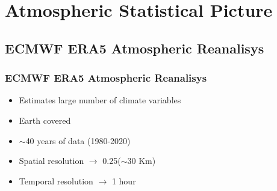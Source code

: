 \documentclass[10pt,aspectratio=169]{beamer}
\begin{document}
\section{Atmospheric Statistical Picture}

\subsection{ECMWF ERA5 Atmospheric Reanalisys}

\begin{frame}
\frametitle{ECMWF ERA5 Atmospheric Reanalisys}

\begin{itemize}
\item<1-8> Estimates large number of climate variables
\item<2-8> Earth covered
\item<3-8> $\sim$40 years of data (1980-2020)
\item<4-8> Spatial resolution $\rightarrow$ 0.25\textdegree ($\sim$30 Km)
\item<5-8> Temporal resolution $\rightarrow$ 1 hour
\end{itemize}




\end{frame}
\end{document}
